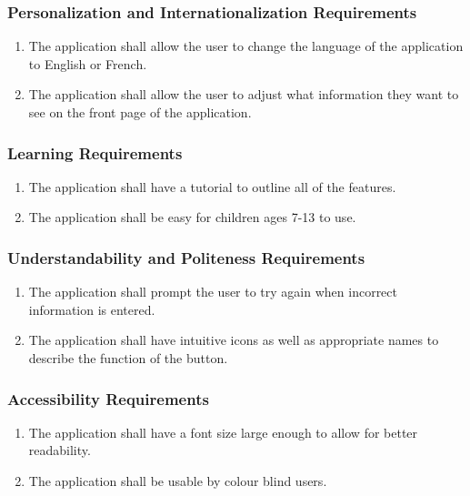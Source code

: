 \documentclass[]{article}
\begin{document}
\subsubsection{Personalization and Internationalization Requirements}
\label{ssub:personalization_and_internationalization_requirements}
\begin{enumerate}[{UH}1. ]
	\item The application shall allow the user to change the language of the
application to English or French.
	\item The application shall allow the user to adjust what information they want
to see on the front page of the application.
\end{enumerate}

\subsubsection{Learning Requirements}
\label{ssub:learning_requirements}
\begin{enumerate}[{UH}1. ]
	\item The application shall have a tutorial to outline all of the features.
	\item The application shall be easy for children ages 7-13 to use.
\end{enumerate}

\subsubsection{Understandability and Politeness Requirements}
\label{ssub:understandability_and_politeness_requirements}
\begin{enumerate}[{UH}1. ]
	\item The application shall prompt the user to try again when incorrect
information is entered.
	\item The application shall have intuitive icons as well as appropriate names
to describe the function of the button.
\end{enumerate}

\subsubsection{Accessibility Requirements}
\label{ssub:accessibility_requirements}
\begin{enumerate}[{UH}1. ]
	\item The application shall have a font size large enough to allow for better
readability.
	\item The application shall be usable by colour blind users.
\end{enumerate}
\end{document}
